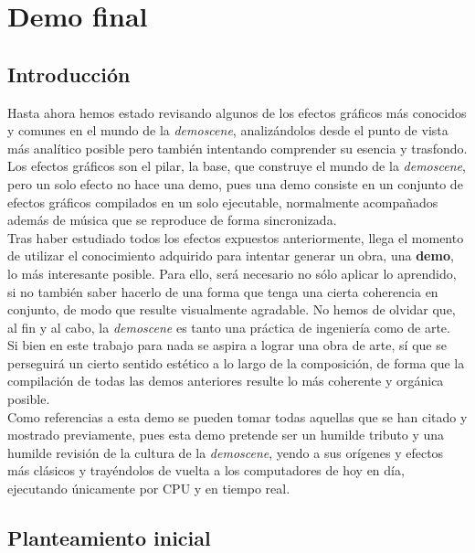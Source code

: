 \chapter{Demo final}

\section{Introducción}

Hasta ahora hemos estado revisando algunos de los efectos gráficos más conocidos y comunes en el mundo de la \emph{demoscene}, analizándolos desde el punto de vista más analítico posible pero también intentando comprender su esencia y trasfondo.\\

Los efectos gráficos son el pilar, la base, que construye el mundo de la \emph{demoscene}, pero un solo efecto no hace una demo, pues una demo consiste en un conjunto de efectos gráficos compilados en un solo ejecutable, normalmente acompañados además de música que se reproduce de forma sincronizada.\\

Tras haber estudiado todos los efectos expuestos anteriormente, llega el momento de utilizar el conocimiento adquirido para intentar generar un obra, una \textbf{demo}, lo más interesante posible. Para ello, será necesario no sólo aplicar lo aprendido, si no también saber hacerlo de una forma que tenga una cierta coherencia en conjunto, de modo que resulte visualmente agradable. No hemos de olvidar que, al fin y al cabo, la \emph{demoscene} es tanto una práctica de ingeniería como de arte.\\

Si bien en este trabajo para nada se aspira a lograr una obra de arte, sí que se perseguirá un cierto sentido estético a lo largo de la composición, de forma que la compilación de todas las demos anteriores resulte lo más coherente y orgánica posible.\\

Como referencias a esta demo se pueden tomar todas aquellas que se han citado y mostrado previamente, pues esta demo pretende ser un humilde tributo y una humilde revisión de la cultura de la \emph{demoscene}, yendo a sus orígenes y efectos más clásicos y trayéndolos de vuelta a los computadores de hoy en día, ejecutando únicamente por CPU y en tiempo real.\\

\section{Planteamiento inicial}

